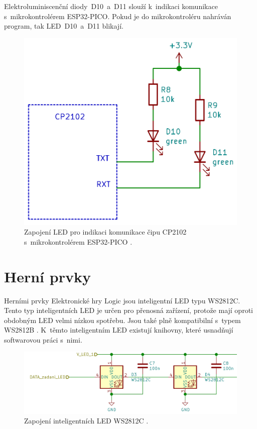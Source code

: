   Elektroluminiscenční diody~D10~a~D11 slouží k~indikaci komunikace s~mikrokontrolérem ESP32-PICO. Pokud je do mikrokontroléru nahráván program, tak LED~D10~a~D11 
  blikají.

  \begin{figure}[!h]
      \begin{center}
        \includegraphics[scale=0.35]{obrazky/CP2102_LED.png}
      \end{center}
      \caption[Zapojení LED pro indikaci komunikace čipu CP2102 s~mikrokontrolérem ESP32-PICO \cite{CP2102_datasheet}]{Zapojení LED pro indikaci 
      komunikace čipu CP2102 s~mikrokontrolérem ESP32-PICO \cite{CP2102_datasheet}.}
  \end{figure}

  \newpage
  \section{Herní prvky}
  Herními prvky Elektronické hry Logic jsou inteligentní LED typu WS2812C. Tento typ inteligentních LED je určen pro přenosná 
  zařízení, protože mají oproti obdobným LED velmi nízkou spotřebu. Jsou také plně kompatibilní s~typem WS2812B \cite{WS2812C_datasheet}. K~těmto 
  inteligentním LED existují knihovny, které usnadňují softwarovou práci s~nimi.

  \begin{figure}[!h]
    \begin{center}
      \includegraphics[scale=0.4]{obrazky/2_LED_WS2812C.png}
    \end{center}
    \caption[Zapojení inteligentních LED WS2812C \cite{WS2812C_datasheet}]{Zapojení inteligentních LED WS2812C \cite{WS2812C_datasheet}.}
  \end{figure}

